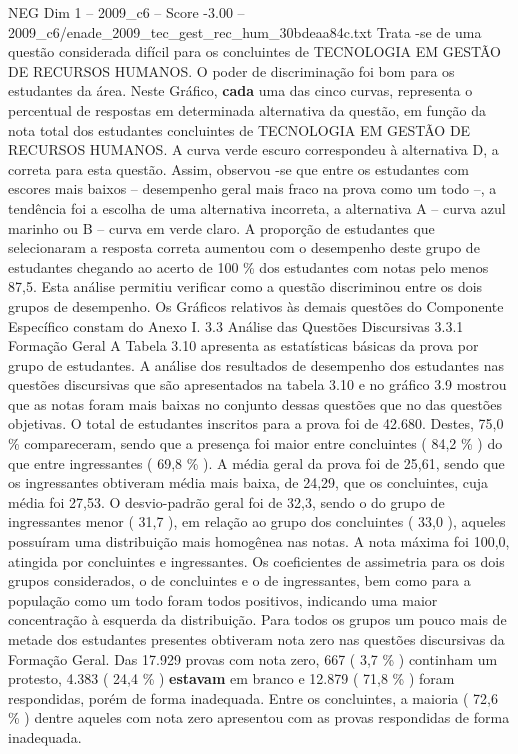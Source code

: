 \begin{textsample}{NEG Dim 1 – 2009\_c6 – Score -3.00 – 2009\_c6/enade\_2009\_tec\_gest\_rec\_hum\_30bdeaa84c.txt}
Trata -se de uma questão considerada difícil para os concluintes de TECNOLOGIA EM GESTÃO DE RECURSOS HUMANOS.
O poder de discriminação foi bom para os estudantes da área.
Neste Gráfico, \textbf{cada} uma das cinco curvas, representa o percentual de respostas em determinada alternativa da questão, em função da nota total dos estudantes concluintes de TECNOLOGIA EM GESTÃO DE RECURSOS HUMANOS.
A curva verde escuro correspondeu à alternativa D, a correta para esta questão.
Assim, observou -se que entre os estudantes com escores mais baixos – desempenho geral mais fraco na prova como um todo –, a tendência foi a escolha de uma alternativa incorreta, a alternativa A – curva azul marinho ou B – curva em verde claro.
A proporção de estudantes que selecionaram a resposta correta aumentou com o desempenho deste grupo de estudantes chegando ao acerto de 100 \% dos estudantes com notas pelo menos 87,5.
Esta análise permitiu verificar como a questão discriminou entre os dois grupos de desempenho.
Os Gráficos relativos às demais questões do Componente Específico constam do Anexo I. 3.3 Análise das Questões Discursivas 3.3.1 Formação Geral A Tabela 3.10 apresenta as estatísticas básicas da prova por grupo de estudantes.
A análise dos resultados de desempenho dos estudantes nas questões discursivas que são apresentados na tabela 3.10 e no gráfico 3.9 mostrou que as notas foram mais baixas no conjunto dessas questões que no das questões objetivas.
O total de estudantes inscritos para a prova foi de 42.680.
Destes, 75,0 \% compareceram, sendo que a presença foi maior entre concluintes ( 84,2 \% ) do que entre ingressantes ( 69,8 \% ).
A média geral da prova foi de 25,61, sendo que os ingressantes obtiveram média mais baixa, de 24,29, que os concluintes, cuja média foi 27,53.
O desvio-padrão geral foi de 32,3, sendo o do grupo de ingressantes menor ( 31,7 ), em relação ao grupo dos concluintes ( 33,0 ), aqueles possuíram uma distribuição mais homogênea nas notas.
A nota máxima foi 100,0, atingida por concluintes e ingressantes.
Os coeficientes de assimetria para os dois grupos considerados, o de concluintes e o de ingressantes, bem como para a população como um todo foram todos positivos, indicando uma maior concentração à esquerda da distribuição.
Para todos os grupos um pouco mais de metade dos estudantes presentes obtiveram nota zero nas questões discursivas da Formação Geral.
Das 17.929 provas com nota zero, 667 ( 3,7 \% ) continham um protesto, 4.383 ( 24,4 \% ) \textbf{estavam} em branco e 12.879 ( 71,8 \% ) foram respondidas, porém de forma inadequada.
Entre os concluintes, a maioria ( 72,6 \% ) dentre aqueles com nota zero apresentou com as provas respondidas de forma inadequada.

\end{textsample}
